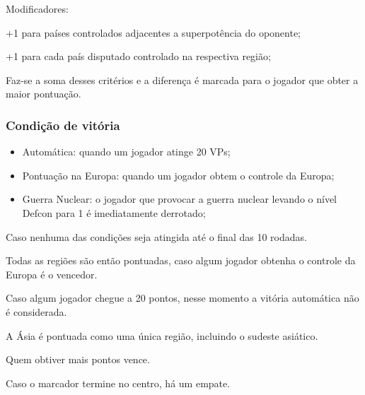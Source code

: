\documentclass[11pt]{article}
\begin{document}
Modificadores:

+1 para países controlados adjacentes a superpotência do oponente;

+1 para cada país disputado controlado na respectiva região;

Faz-se a soma desses critérios e a diferença é marcada para o jogador que obter a maior pontuação.

\subsubsection{Condição de vitória}
\label{sec:org51eef53}

\begin{itemize}
\item Automática: quando um jogador atinge 20 VPs;

\item Pontuação na Europa: quando um jogador obtem o controle da Europa;

\item Guerra Nuclear: o jogador que provocar a guerra nuclear levando o nível Defcon para 1 é imediatamente derrotado;
\end{itemize}


Caso nenhuma das condições seja atingida até o final das 10 rodadas.

Todas as regiões são então pontuadas, caso algum jogador obtenha o controle da Europa é o vencedor.

Caso algum jogador chegue a 20 pontos, nesse momento a vitória automática não é considerada.

A Ásia é pontuada como uma única região, incluindo o sudeste asiático.

Quem obtiver mais pontos vence.

Caso o marcador termine no centro, há um empate.
\end{document}
